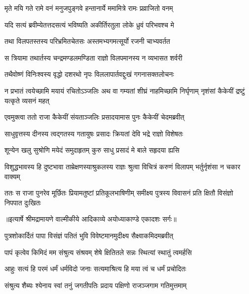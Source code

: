 \twolineshloka
{मृते मयि गते रामे वनं मनुजपुङ्गवे}
{हन्तानार्ये ममामित्रे रामः प्रव्राजितो वनम्} %

\twolineshloka
{यदि सत्यं ब्रवीम्येतत्तदसत्यं भविष्यति}
{अकीर्तिरतुला लोके ध्रुवं परिभवश्च मे} %

\twolineshloka
{तथा विलपतस्तस्य परिभ्रमितचेतसः}
{अस्तमभ्यगमत्सूर्यो रजनी चाभ्यवर्तत} %

\twolineshloka
{स त्रियामा तथार्तस्य चन्द्रमण्डलमण्डिता}
{राज्ञो विलपमानस्य न व्यभासत शर्वरी} %

\twolineshloka
{तथैवोष्णं विनिःश्वस्य वृद्धो दशरथो नृपः}
{विललापार्तवद्दुःखं गगनासक्तलोचनः} %

\threelineshloka
{न प्रभातं त्वयेच्छामि मयायं रचितोऽञ्जलिः}
{अथ वा गम्यतां शीघ्रं नाहमिच्छामि निर्घृणाम्}
{नृशंसां कैकेयीं द्रष्टुं यत्कृते व्यसनं महत्} %

\twolineshloka
{एवमुक्त्वा ततो राजा कैकेयीं संयताञ्जलिः}
{प्रसादयामास पुनः कैकेयीं चेदमब्रवीत्} %

\twolineshloka
{साधुवृत्तस्य दीनस्य त्वद्गतस्य गतायुषः}
{प्रसादः क्रियतां देवि भद्रे राज्ञो विशेषतः} %

\twolineshloka
{शून्येन खलु सुश्रोणि मयेदं समुदाहृतम्}
{कुरु साधु प्रसादं मे बाले सहृदया ह्यसि} %

\fourlineindentedshloka
{विशुद्धभावस्य हि दुष्टभावा}
{ताम्रेक्षणस्याश्रुकलस्य राज्ञः}
{श्रुत्वा विचित्रं करुणं विलापम्}
{भर्तुर्नृशंसा न चकार वाक्यम्} %

\fourlineindentedshloka
{ततः स राजा पुनरेव मूर्छितः}
{प्रियामतुष्टां प्रतिकूलभाषिणीम्}
{समीक्ष्य पुत्रस्य विवासनं प्रति}
{क्षितौ विसंज्ञो निपपात दुःखितः} %


{॥इत्यार्षे श्रीमद्रामायणे वाल्मीकीये आदिकाव्ये अयोध्याकाण्डे एकादशः सर्गः॥}


\twolineshloka
{पुत्रशोकार्दितं पापा विसंज्ञं पतितं भुवि}
{विवेष्टमानमुदीक्ष्य सैक्ष्वाकमिदमब्रवीत्} %

\twolineshloka
{पापं कृत्वेव किमिदं मम संश्रुत्य संश्रवम्}
{शेषे क्षितितले सन्नः स्थित्यां स्थातुं त्वमर्हसि} %

\twolineshloka
{आहुः सत्यं हि परमं धर्मं धर्मविदो जनाः}
{सत्यमाश्रित्य हि मया त्वं च धर्मं प्रचोदितः} %

\twolineshloka
{संश्रुत्य शैब्यः श्येनाय स्वां तनुं जगतीपतिः}
{प्रदाय पक्षिणो राजञ्जगाम गतिमुत्तमाम्} %

